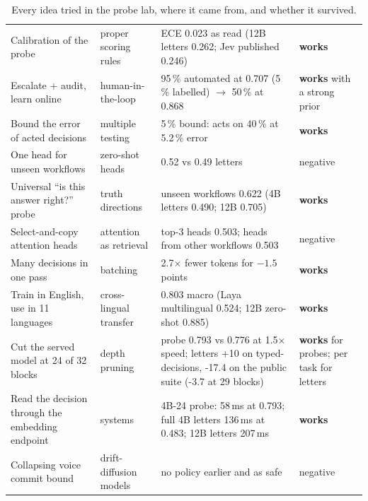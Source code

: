 \documentclass[11pt,a4paper]{article}
\begin{document}
\begin{table}[p]
\begin{tabularx}{\textwidth}{L{42mm} L{30mm} X L{20mm}}
Calibration of the probe & proper scoring rules & ECE 0.023 as read (12B letters 0.262; Jev published 0.246) & \textbf{works} \\
Escalate + audit, learn online & human-in-the-loop \cite{rauch} & 95\,\% automated at 0.707 (5\,\% labelled) $\to$ 50\,\% at 0.868 & \textbf{works} with a strong prior \\
Bound the error of acted decisions & multiple testing \cite{confsel} & 5\,\% bound: acts on 40\,\% at 5.2\,\% error & \textbf{works} \\
One head for unseen workflows & zero-shot heads \cite{chenhf} & 0.52 vs 0.49 letters & negative \\
Universal ``is this answer right?'' probe & truth directions \cite{truthhyper,orgad} & unseen workflows 0.622 (4B letters 0.490; 12B 0.705) & \textbf{works} \\
Select-and-copy attention heads & attention as retrieval \cite{selectcopy} & top-3 heads 0.503; heads from other workflows 0.503 & negative \\
Many decisions in one pass & batching \cite{mti} & 2.7$\times$ fewer tokens for $-1.5$ points & \textbf{works} \\
Train in English, use in 11 languages & cross-lingual transfer \cite{wendler} & 0.803 macro (Laya multilingual 0.524; 12B zero-shot 0.885) & \textbf{works} \\
Cut the served model at 24 of 32 blocks & depth pruning \cite{shortgpt} & probe 0.793 vs 0.776 at 1.5$\times$ speed; letters +10 on typed-decisions, -17.4 on the public suite (-3.7 at 29 blocks) & \textbf{works} for probes; per task for letters \\
Read the decision through the embedding endpoint & systems & 4B-24 probe: 58\,ms at 0.793; full 4B letters 136\,ms at 0.483; 12B letters 207\,ms & \textbf{works} \\
Collapsing voice commit bound & drift-diffusion models & no policy earlier and as safe & negative \\
\bottomrule
\end{tabularx}
\caption{Every idea tried in the probe lab, where it came from, and whether it survived.}
\label{tab:lab}
\end{table}
\end{document}
